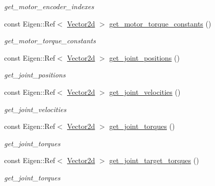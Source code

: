 \begin{DoxyCompactItemize}
\begin{DoxyCompactList}\small\item\em get\+\_\+motor\+\_\+encoder\+\_\+indexes \end{DoxyCompactList}\item 
const Eigen\+::\+Ref$<$ \hyperlink{common__header_8hpp_acb6916bc8c9fe9d98c484fd4cc201447}{Vector2d} $>$ \hyperlink{classblmc__robots_1_1Stuggihop_a4c0847fc848bab2d1ad7f76542fffb3c}{get\+\_\+motor\+\_\+torque\+\_\+constants} ()
\begin{DoxyCompactList}\small\item\em get\+\_\+motor\+\_\+torque\+\_\+constants \end{DoxyCompactList}\item 
const Eigen\+::\+Ref$<$ \hyperlink{common__header_8hpp_acb6916bc8c9fe9d98c484fd4cc201447}{Vector2d} $>$ \hyperlink{classblmc__robots_1_1Stuggihop_a776d704e7fd109da3095d4da03fcf12b}{get\+\_\+joint\+\_\+positions} ()
\begin{DoxyCompactList}\small\item\em get\+\_\+joint\+\_\+positions \end{DoxyCompactList}\item 
const Eigen\+::\+Ref$<$ \hyperlink{common__header_8hpp_acb6916bc8c9fe9d98c484fd4cc201447}{Vector2d} $>$ \hyperlink{classblmc__robots_1_1Stuggihop_ad06f6d6a3cb3f85848fce1178bc60dd1}{get\+\_\+joint\+\_\+velocities} ()
\begin{DoxyCompactList}\small\item\em get\+\_\+joint\+\_\+velocities \end{DoxyCompactList}\item 
const Eigen\+::\+Ref$<$ \hyperlink{common__header_8hpp_acb6916bc8c9fe9d98c484fd4cc201447}{Vector2d} $>$ \hyperlink{classblmc__robots_1_1Stuggihop_a977ef0340cc0cbf164f9ba492736ca18}{get\+\_\+joint\+\_\+torques} ()
\begin{DoxyCompactList}\small\item\em get\+\_\+joint\+\_\+torques \end{DoxyCompactList}\item 
const Eigen\+::\+Ref$<$ \hyperlink{common__header_8hpp_acb6916bc8c9fe9d98c484fd4cc201447}{Vector2d} $>$ \hyperlink{classblmc__robots_1_1Stuggihop_a2cad739e379d40ac6ccc50091ed3d456}{get\+\_\+joint\+\_\+target\+\_\+torques} ()
\begin{DoxyCompactList}\small\item\em get\+\_\+joint\+\_\+torques \end{DoxyCompactList}\item 

\end{DoxyCompactItemize}
